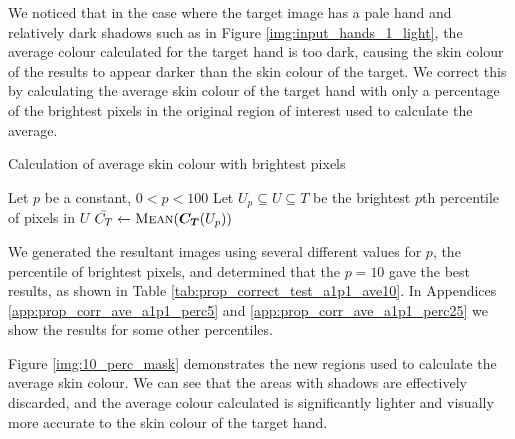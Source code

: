 We noticed that in the case where the target image has a pale hand and relatively dark shadows such as in Figure \ref{img:input_hands_1_light}, the average colour calculated for the target hand is too dark, causing the skin colour of the results to appear darker than the skin colour of the target. We correct this by calculating the average skin colour of the target hand with only a percentage of the brightest pixels in the original region of interest used to calculate the average. 

\begin{algorithm}[H]
\caption{Calculation of average skin colour with brightest pixels}
\label{eq:prop_corr_ave_algo}
\begin{algorithmic}
\State Let $p$ be a constant, $0 < p  < 100$
\State Let $U_p \subseteq U \subseteq T$ be the brightest $p$th percentile of pixels in $U$
\State $\mean{C_T} \gets \Call{Mean}{\vect{C_T}(U_p)}$
\end{algorithmic}
\end{algorithm}

We generated the resultant images using several different values for $p$, the percentile of brightest pixels, and determined that the $p = 10$ gave the best results, as shown in Table \ref{tab:prop_correct_test_a1p1_ave10}. In Appendices \ref{app:prop_corr_ave_a1p1_perc5} and \ref{app:prop_corr_ave_a1p1_perc25} we show the results for some other percentiles.



Figure \ref{img:10_perc_mask} demonstrates the new regions used to calculate the average skin colour. We can see that the areas with shadows are effectively discarded, and the average colour calculated is significantly lighter and visually more accurate to the skin colour of the target hand. 

